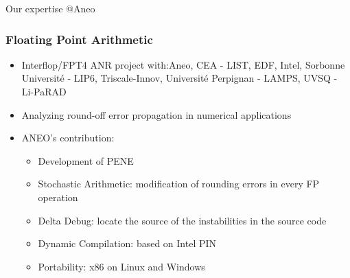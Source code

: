 \documentclass[10pt,aspectratio=1609]{beamer}
\begin{document}
\begin{section}{Our expertise @Aneo}
  \begin{frame}
    \frametitle{Floating Point Arithmetic}
    \begin{itemize}
      \item Interflop/FPT4 ANR project with:Aneo, CEA - LIST, EDF, Intel, Sorbonne Université - LIP6, Triscale-Innov, Université Perpignan - LAMPS, UVSQ - Li-PaRAD
      \item Analyzing round-off error propagation in numerical applications
      \item ANEO's contribution:
      \begin{itemize}
        \item Development of PENE
        \item Stochastic Arithmetic: modification of rounding errors in every FP operation
        \item Delta Debug: locate the source of the instabilities in the source code
        \item Dynamic Compilation: based on Intel PIN
        \item Portability: x86 on Linux and Windows
      \end{itemize}
    \end{itemize}
  \end{frame}
\end{section}
\end{document}

